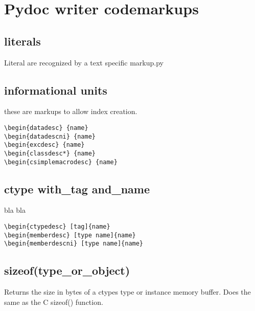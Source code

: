 \ifx\locallinewidth\undefined\newlength{\locallinewidth}\fi
\setlength{\locallinewidth}{\linewidth}


\section{Pydoc writer codemarkups\label{-pydoc-writer-codemarkups}}


\subsection{literals\label{-literals}}

Literal are recognized by a text specific markup.py


\subsection{informational units\label{-informational-units}}

these are markups to allow index creation.
\begin{verbatim}
\begin{datadesc} {name}
\begin{datadescni} {name}
\begin{excdesc} {name}
\begin{classdesc*} {name}
\begin{csimplemacrodesc} {name}
\end{verbatim}


\subsection{ctype with{\_}tag and{\_}name\label{-ctype-with_tag-and_name}}

bla bla

\begin{verbatim}
\begin{ctypedesc} [tag]{name}
\begin{memberdesc} [type name]{name}
\begin{memberdescni} [type name]{name}
\end{verbatim}


\subsection{sizeof(type{\_}or{\_}object)\label{-sizeof}}

Returns the size in bytes of a ctypes type or instance memory
buffer.  Does the same as the C sizeof() function.

